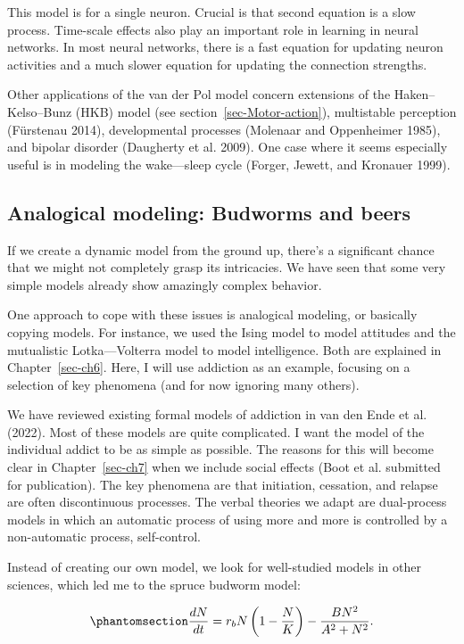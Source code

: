 \documentclass[
  a4paper,
  DIV=11,
  numbers=noendperiod,
  oneside]{scrreprt}
\begin{document}
This model is for a single neuron. Crucial is that second equation is a
slow process. Time-scale effects also play an important role in learning
in neural networks. In most neural networks, there is a fast equation
for updating neuron activities and a much slower equation for updating
the connection strengths.

Other applications of the van der Pol model concern extensions of the
Haken--Kelso--Bunz (HKB) model (see section~\ref{sec-Motor-action}),
multistable perception (Fürstenau 2014), developmental processes
(Molenaar and Oppenheimer 1985), and bipolar disorder (Daugherty et al.
2009). One case where it seems especially useful is in modeling the
wake---sleep cycle (Forger, Jewett, and Kronauer 1999).

\subsection{Analogical modeling: Budworms and
beers}\label{sec-Analogical-modeling-Budworms-and-Beers}

If we create a dynamic model from the ground up, there's a significant
chance that we might not completely grasp its intricacies. We have seen
that some very simple models already show amazingly complex behavior.

One approach to cope with these issues is analogical modeling, or
basically copying models. For instance, we used the Ising model to model
attitudes and the mutualistic Lotka---Volterra model to model
intelligence. Both are explained in Chapter~\ref{sec-ch6}. Here, I will
use addiction as an example, focusing on a selection of key phenomena
(and for now ignoring many others).

We have reviewed existing formal models of addiction in van den Ende et
al. (2022). Most of these models are quite complicated. I want the model
of the individual addict to be as simple as possible. The reasons for
this will become clear in Chapter~\ref{sec-ch7} when we include social
effects (Boot et al. submitted for publication). The key phenomena are
that initiation, cessation, and relapse are often discontinuous
processes. The verbal theories we adapt are dual-process models in which
an automatic process of using more and more is controlled by a
non-automatic process, self-control.

Instead of creating our own model, we look for well-studied models in
other sciences, which led me to the spruce budworm model:

\begin{equation}\phantomsection\label{eq-ch4n-17-old-37}{
\frac{dN}{dt} = r_{b}N\left( 1 - \frac{N}{K} \right) - \frac{BN^{2}}{A^{2} + N^{2}}.
}\end{equation}
\end{document}
